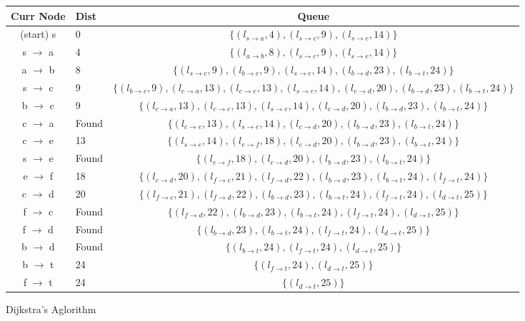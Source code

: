 \documentclass[12pt]{article}
\begin{document}
\begin{figure}[H]
\centering
\caption{Dijkstra's Aglorithm}
\begin{tabular}{c l c}
\toprule
Curr Node & Dist & Queue \\
\midrule
(start) s & 0 & $\{(l_{s\rightarrow a}, 4), (l_{s\rightarrow c}, 9), (l_{s\rightarrow e}, 14)\}$ \\
s $\rightarrow$ a & 4 & $\{(l_{a\rightarrow b}, 8), (l_{s\rightarrow c}, 9), (l_{s\rightarrow e}, 14)\}$ \\
a $\rightarrow$ b & 8 & $\{(l_{s\rightarrow c}, 9), (l_{b\rightarrow c}, 9), (l_{s\rightarrow e}, 14), (l_{b\rightarrow d}, 23), (l_{b\rightarrow t}, 24)\}$ \\
s $\rightarrow$ c & 9 & $\{(l_{b\rightarrow c}, 9), (l_{c\rightarrow a}, 13), (l_{c\rightarrow e}, 13), (l_{s\rightarrow e}, 14), (l_{c\rightarrow d}, 20), (l_{b\rightarrow d}, 23), (l_{b\rightarrow t}, 24)\}$ \\
b $\rightarrow$ c & 9 & $\{(l_{c\rightarrow a}, 13), (l_{c\rightarrow e}, 13), (l_{s\rightarrow e}, 14), (l_{c\rightarrow d}, 20), (l_{b\rightarrow d}, 23), (l_{b\rightarrow t}, 24)\}$ \\
c $\rightarrow$ a & Found & $\{(l_{c\rightarrow e}, 13), (l_{s\rightarrow e}, 14), (l_{c\rightarrow d}, 20), (l_{b\rightarrow d}, 23), (l_{b\rightarrow t}, 24)\}$ \\
c $\rightarrow$ e & 13 & $\{(l_{s\rightarrow e}, 14), (l_{e\rightarrow f}, 18), (l_{c\rightarrow d}, 20), (l_{b\rightarrow d}, 23), (l_{b\rightarrow t}, 24)\}$ \\
s $\rightarrow$ e & Found & $\{(l_{e\rightarrow f}, 18), (l_{c\rightarrow d}, 20), (l_{b\rightarrow d}, 23), (l_{b\rightarrow t}, 24)\}$ \\
e $\rightarrow$ f & 18 & $\{(l_{c\rightarrow d}, 20), (l_{f\rightarrow c}, 21), (l_{f\rightarrow d}, 22), (l_{b\rightarrow d}, 23), (l_{b\rightarrow t}, 24), (l_{f\rightarrow t}, 24)\}$ \\
c $\rightarrow$ d & 20 & $\{(l_{f\rightarrow c}, 21), (l_{f\rightarrow d}, 22), (l_{b\rightarrow d}, 23), (l_{b\rightarrow t}, 24), (l_{f\rightarrow t}, 24), (l_{d\rightarrow t}, 25)\}$ \\
f $\rightarrow$ c & Found & $\{(l_{f\rightarrow d}, 22), (l_{b\rightarrow d}, 23), (l_{b\rightarrow t}, 24), (l_{f\rightarrow t}, 24), (l_{d\rightarrow t}, 25)\}$ \\
f $\rightarrow$ d & Found & $\{(l_{b\rightarrow d}, 23), (l_{b\rightarrow t}, 24), (l_{f\rightarrow t}, 24), (l_{d\rightarrow t}, 25)\}$ \\
b $\rightarrow$ d & Found & $\{(l_{b\rightarrow t}, 24), (l_{f\rightarrow t}, 24), (l_{d\rightarrow t}, 25)\}$ \\
b $\rightarrow$ t & 24 & $\{(l_{f\rightarrow t}, 24), (l_{d\rightarrow t}, 25)\}$ \\
f $\rightarrow$ t & 24 & $\{(l_{d\rightarrow t}, 25)\}$ \\
\end{tabular}
\end{figure}
\end{document}
